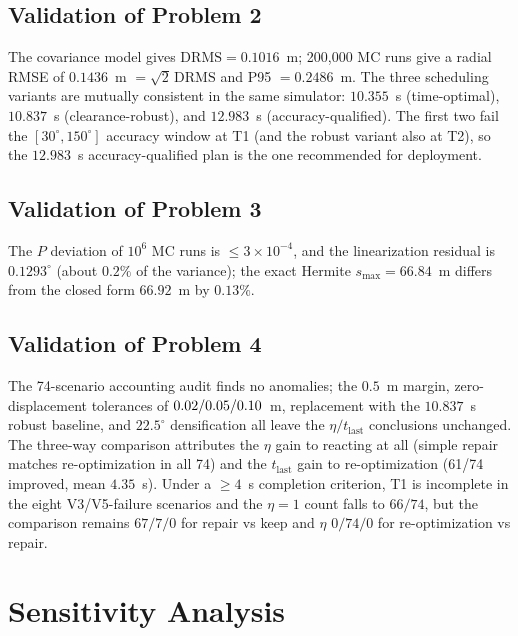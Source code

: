 \subsection{Validation of Problem 2}

The covariance model gives $\mathrm{DRMS}=0.1016$~m; 200,000 MC runs give a radial RMSE of $0.1436$~m $=\sqrt2\,\mathrm{DRMS}$ and P95 $=0.2486$~m. The three scheduling variants are mutually consistent in the same simulator: $10.355$~s (time-optimal), $10.837$~s (clearance-robust), and $12.983$~s (accuracy-qualified). The first two fail the $[30^\circ,150^\circ]$ accuracy window at T1 (and the robust variant also at T2), so the $12.983$~s accuracy-qualified plan is the one recommended for deployment.

\subsection{Validation of Problem 3}

The $P$ deviation of $10^6$ MC runs is $\le3\times10^{-4}$, and the linearization residual is $0.1293^\circ$ (about $0.2\%$ of the variance); the exact Hermite $s_{\max}=66.84$~m differs from the closed form $66.92$~m by $0.13\%$.

\subsection{Validation of Problem 4}

The 74-scenario accounting audit finds no anomalies; the $0.5$~m margin, zero-displacement tolerances of $0.02/\allowbreak0.05/\allowbreak0.10$~m, replacement with the $10.837$~s robust baseline, and $22.5^\circ$ densification all leave the $\eta/t_{\mathrm{last}}$ conclusions unchanged. The three-way comparison attributes the $\eta$ gain to reacting at all (simple repair matches re-optimization in all 74) and the $t_{\mathrm{last}}$ gain to re-optimization (61/74 improved, mean $4.35$~s). Under a $\ge4$~s completion criterion, T1 is incomplete in the eight V3/V5-failure scenarios and the $\eta=1$ count falls to $66/74$, but the comparison remains $67/7/0$ for repair vs keep and $\eta$ $0/74/0$ for re-optimization vs repair.

\section{Sensitivity Analysis}
\label{sec:sensitivity}

